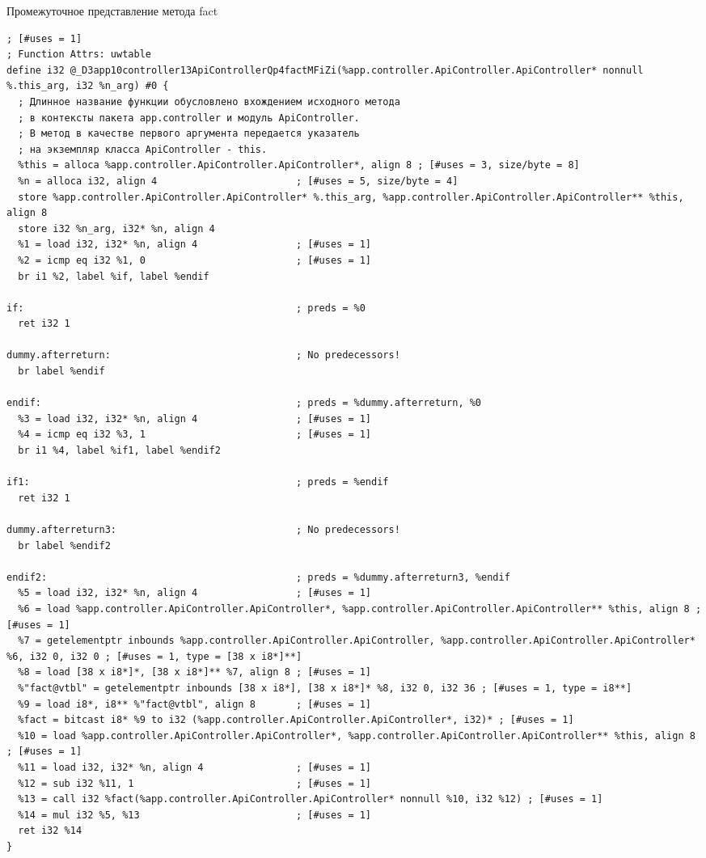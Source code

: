 \documentclass{studrep}
\begin{document}
\begin{listing}[H]
\caption{Промежуточное представление метода fact}
\begin{verbatim}
; [#uses = 1]
; Function Attrs: uwtable
define i32 @_D3app10controller13ApiControllerQp4factMFiZi(%app.controller.ApiController.ApiController* nonnull %.this_arg, i32 %n_arg) #0 {
  ; Длинное название функции обусловлено вхождением исходного метода
  ; в контексты пакета app.controller и модуль ApiController.
  ; В метод в качестве первого аргумента передается указатель
  ; на экземпляр класса ApiController - this.
  %this = alloca %app.controller.ApiController.ApiController*, align 8 ; [#uses = 3, size/byte = 8]
  %n = alloca i32, align 4                        ; [#uses = 5, size/byte = 4]
  store %app.controller.ApiController.ApiController* %.this_arg, %app.controller.ApiController.ApiController** %this, align 8
  store i32 %n_arg, i32* %n, align 4
  %1 = load i32, i32* %n, align 4                 ; [#uses = 1]
  %2 = icmp eq i32 %1, 0                          ; [#uses = 1]
  br i1 %2, label %if, label %endif

if:                                               ; preds = %0
  ret i32 1

dummy.afterreturn:                                ; No predecessors!
  br label %endif

endif:                                            ; preds = %dummy.afterreturn, %0
  %3 = load i32, i32* %n, align 4                 ; [#uses = 1]
  %4 = icmp eq i32 %3, 1                          ; [#uses = 1]
  br i1 %4, label %if1, label %endif2

if1:                                              ; preds = %endif
  ret i32 1

dummy.afterreturn3:                               ; No predecessors!
  br label %endif2

endif2:                                           ; preds = %dummy.afterreturn3, %endif
  %5 = load i32, i32* %n, align 4                 ; [#uses = 1]
  %6 = load %app.controller.ApiController.ApiController*, %app.controller.ApiController.ApiController** %this, align 8 ; [#uses = 1]
  %7 = getelementptr inbounds %app.controller.ApiController.ApiController, %app.controller.ApiController.ApiController* %6, i32 0, i32 0 ; [#uses = 1, type = [38 x i8*]**]
  %8 = load [38 x i8*]*, [38 x i8*]** %7, align 8 ; [#uses = 1]
  %"fact@vtbl" = getelementptr inbounds [38 x i8*], [38 x i8*]* %8, i32 0, i32 36 ; [#uses = 1, type = i8**]
  %9 = load i8*, i8** %"fact@vtbl", align 8       ; [#uses = 1]
  %fact = bitcast i8* %9 to i32 (%app.controller.ApiController.ApiController*, i32)* ; [#uses = 1]
  %10 = load %app.controller.ApiController.ApiController*, %app.controller.ApiController.ApiController** %this, align 8 ; [#uses = 1]
  %11 = load i32, i32* %n, align 4                ; [#uses = 1]
  %12 = sub i32 %11, 1                            ; [#uses = 1]
  %13 = call i32 %fact(%app.controller.ApiController.ApiController* nonnull %10, i32 %12) ; [#uses = 1]
  %14 = mul i32 %5, %13                           ; [#uses = 1]
  ret i32 %14
}
\end{verbatim}
\end{listing}
\end{document}
